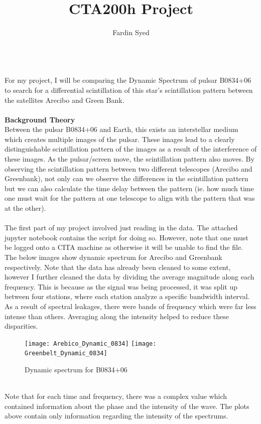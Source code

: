 \documentclass{article}
\begin{document}
\title{CTA200h Project }
\author{Fardin Syed}

\maketitle
{}
\\
For my project, I will be comparing the Dynamic Spectrum of pulsar B0834+06 to search for a differential scintillation of this star's scintillation pattern between the satellites Arecibo and Green Bank. 
\\
\\
{\large \bf Background Theory}
\\
Between the pulsar B0834+06 and Earth, this exists an interstellar medium which creates multiple images of the pulsar. These images lead to a clearly distinguishable scintillation pattern of the images as a result of the interference of these images.  As the pulsar/screen move, the scintillation pattern also moves. By observing the scintillation pattern between two different telescopes (Arecibo and Greenbank), not only can we observe the differences in the scintillation pattern but we can also calculate the time delay between the pattern (ie. how much time one must wait for the pattern at one telescope to align with the pattern that was at the other). 
\\
\\
The first part of my project involved just reading in the data. The attached jupyter notebook contains the script for doing so. However, note that one must be logged onto a CITA machine as otherwise it will be unable to find the file.
\\
The below images show dynamic spectrum for Arecibo and Greenbank respectively. Note that the data has already been cleaned to some extent, however I further cleaned the data by dividing the average magnitude along each frequency. This is because as the signal was being processed, it was split up between four stations, where each station analyze a specific bandwidth interval. As a result of spectral leakages, there were bands of frequency which were far less intense than others. Averaging along the intensity helped to reduce these disparities. 
\begin{figure}[h]
\texttt{[image: Arebico\_Dynamic\_0834]}
\texttt{[image: Greenbelt\_Dynamic\_0834]}
\centering
\caption{Dynamic spectrum for B0834+06}
\end{figure}
\\
Note that for each time and frequency, there was a complex value which contained information about the phase and the intensity of the wave. The plots above contain only information regarding the intensity of the spectrums.
\end{document}
